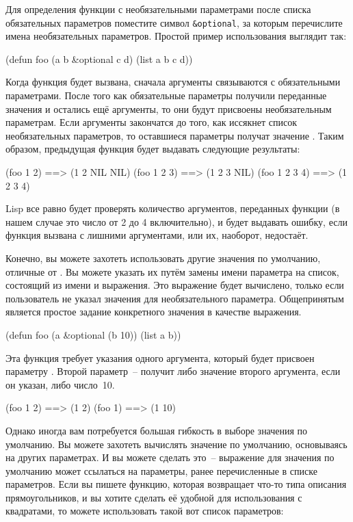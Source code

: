 Для определения функции с необязательными параметрами после списка обязательных параметров
поместите символ \lstinline!&optional!, за которым перечислите имена необязательных
параметров.  Простой пример использования выглядит так:

\begin{myverb}
  (defun foo (a b &optional c d) 
    (list a b c d))
\end{myverb}

Когда функция будет вызвана, сначала аргументы связываются с обязательными параметрами.
После того как обязательные параметры получили переданные значения и остались ещё
аргументы, то они будут присвоены необязательным параметрам.  Если аргументы закончатся до
того, как иссякнет список необязательных параметров, то оставшиеся параметры получат
значение .  Таким образом, предыдущая функция будет выдавать следующие
результаты:

\begin{myverb}
  (foo 1 2)     ==> (1 2 NIL NIL)
  (foo 1 2 3)   ==> (1 2 3 NIL)
  (foo 1 2 3 4) ==> (1 2 3 4)
\end{myverb}

Lisp все равно будет проверять количество аргументов, переданных функции (в нашем случае
это число от 2 до 4 включительно), и будет выдавать ошибку, если функция вызвана с
лишними аргументами, или их, наоборот, недостаёт.

Конечно, вы можете захотеть использовать другие значения по умолчанию, отличные от
.  Вы можете указать их путём замены имени параметра на список, состоящий из
имени и выражения.  Это выражение будет вычислено, только если пользователь не указал
значения для необязательного параметра.  Общепринятым является простое задание конкретного
значения в качестве выражения.

\begin{myverb}
  (defun foo (a &optional (b 10)) 
    (list a b))
\end{myverb}

Эта функция требует указания одного аргумента, который будет присвоен параметру .
Второй параметр~--  получит либо значение второго аргумента, если он указан, либо
число~10.

\begin{myverb}
  (foo 1 2) ==> (1 2)
  (foo 1)   ==> (1 10)
\end{myverb}

Однако иногда вам потребуется большая гибкость в выборе значения по умолчанию.  Вы
можете захотеть вычислять значение по умолчанию, основываясь на других параметрах.  И вы
можете сделать это~-- выражение для значения по умолчанию может ссылаться на параметры,
ранее перечисленные в списке параметров.  Если вы пишете функцию, которая возвращает
что-то типа описания прямоугольников, и вы хотите сделать её удобной для использования с
квадратами, то можете использовать такой вот список параметров:

